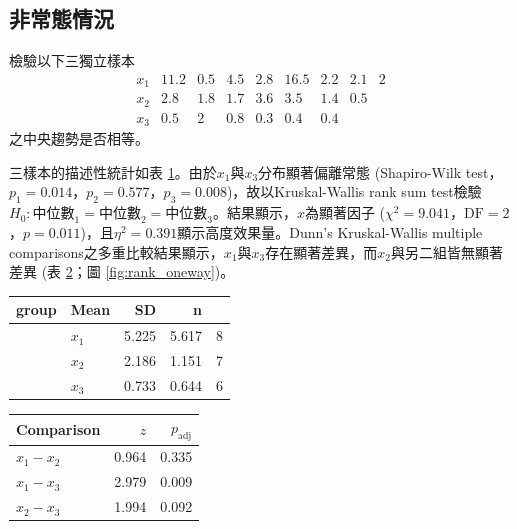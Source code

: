 \documentclass[12pt]{article}
\begin{document}
\subsection{非常態情況}
檢驗以下三獨立樣本
\[
\begin{matrix}
x_1 & 11.2 & 0.5 & 4.5 & 2.8 & 16.5 & 2.2 & 2.1 & 2  \\
x_2 & 2.8 & 1.8 & 1.7 & 3.6 & 3.5 & 1.4 & 0.5 & \\
x_3 & 0.5 & 2 & 0.8 & 0.3 & 0.4 & 0.4 & &
\end{matrix}
\]
之中央趨勢是否相等。

三樣本的描述性統計如表 \ref{table:rank_oneway}。由於$x_1$與$x_3$分布顯著偏離常態 (Shapiro-Wilk test，$p_1 = 0.014$，$p_2 = 0.577$，$p_3 = 0.008$)，故以Kruskal-Wallis rank sum test檢驗$H_0:\text{中位數}_1 = \text{中位數}_2 = \text{中位數}_3$。結果顯示，$x$為顯著因子 ($\chi^2 = 9.041$，$\text{DF} = 2$，$p = 0.011$)，且$\eta^2 = 0.391$顯示高度效果量。Dunn's Kruskal-Wallis multiple comparisons之多重比較結果顯示，$x_1$與$x_3$存在顯著差異，而$x_2$與另二組皆無顯著差異 (表 \ref{table:rank_oneway_post}；圖 \ref{fig:rank_oneway})。

\begin{table}[htb!]
	\centering
	\begin{tabular}{llrrr}
		\hline
		group & Mean & SD & n \\ 
		\hline
		& $x_1$ & 5.225 & 5.617 &    8 \\ 
		& $x_2$ & 2.186 & 1.151 &    7 \\ 
		& $x_3$ & 0.733 & 0.644 &    6 \\ 
		\hline
	\end{tabular}
	\label{table:rank_oneway}
\end{table}

\begin{table}[htb!]
	\centering
	\begin{tabular}{lrr}
		\hline
		Comparison & $z$ & $p_{\mathrm{adj}}$ \\ 
		\hline
		$x_1 - x_2$ & 0.964 & 0.335 \\ 
		$x_1 - x_3$ & 2.979 & 0.009 \\ 
		$x_2 - x_3$ & 1.994 & 0.092 \\ 
		\hline
	\end{tabular}
	\label{table:rank_oneway_post}
\end{table}
\end{document}
